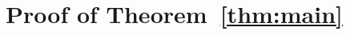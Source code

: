 \documentclass[a4paper]{article}
\newcommand{\anticp}[2]{A_{#1}\left(#2\right)}
\newcommand{\ipac}[1]{ipacc\left(#1\right)}
\newcommand{\ipco}[1]{ipco\left(#1\right)}
\newtheorem{lemma}[theorem]{Lemma}
\begin{document}





\section{Proof of Theorem~\ref{thm:main}} \label{sec:main}
\end{document}
